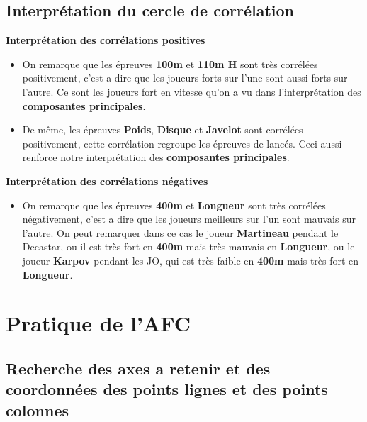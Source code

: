 \documentclass{article}
\begin{document}
\subsection{Interprétation du cercle de corrélation}

\begin{flushleft}
\textbf{Interprétation des corrélations positives}
\end{flushleft}

\begin{itemize}
\item On remarque que les épreuves \textbf{100m} et \textbf{110m H} sont très corrélées positivement, c'est a dire que les joueurs forts sur l'une sont aussi forts sur l'autre. Ce sont les joueurs fort en vitesse qu'on a vu dans l'interprétation des \textbf{composantes principales}.
\item De même, les épreuves \textbf{Poids}, \textbf{Disque} et \textbf{Javelot} sont corrélées positivement, cette corrélation regroupe les épreuves de lancés. Ceci aussi renforce notre interprétation des \textbf{composantes principales}.
\end{itemize}

\begin{flushleft}
\textbf{Interprétation des corrélations négatives}
\end{flushleft}

\begin{itemize}
\item On remarque que les épreuves \textbf{400m} et \textbf{Longueur} sont très corrélées négativement, c'est a dire que les joueurs meilleurs sur l'un sont mauvais sur l'autre. On peut remarquer dans ce cas le joueur \textbf{Martineau} pendant le Decastar, ou il est très fort en \textbf{400m} mais très mauvais en \textbf{Longueur}, ou le joueur \textbf{Karpov} pendant les JO, qui est très faible en \textbf{400m} mais très fort en \textbf{Longueur}.
\end{itemize}

\newpage

\section{Pratique de l'AFC}
\subsection{Recherche des axes a retenir et des coordonnées des points lignes et des points colonnes}
\end{document}
